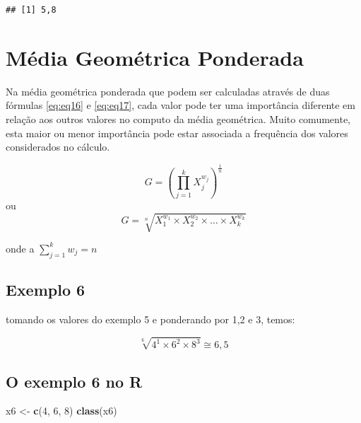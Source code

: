 \documentclass[
]{book}
\newenvironment{Shaded}{\begin{snugshade}}{\end{snugshade}}
\newcommand{\DecValTok}[1]{\textcolor[rgb]{0.00,0.00,0.81}{#1}}
\newcommand{\KeywordTok}[1]{\textcolor[rgb]{0.13,0.29,0.53}{\textbf{#1}}}
\newcommand{\NormalTok}[1]{#1}
\newcommand{\StringTok}[1]{\textcolor[rgb]{0.31,0.60,0.02}{#1}}
\begin{document}
\begin{verbatim}
## [1] 5,8
\end{verbatim}

\hypertarget{muxe9dia-geomuxe9trica-ponderada}{%
\section{Média Geométrica Ponderada}\label{muxe9dia-geomuxe9trica-ponderada}}

Na média geométrica ponderada que podem ser calculadas através de duas fórmulas \eqref{eq:eq16} e \eqref{eq:eq17}, cada valor pode ter uma importância diferente em relação aos outros valores no computo da média geométrica. Muito comumente, esta maior ou menor importância pode estar associada a frequência dos valores considerados no cálculo.

\begin{equation}
    G = \left(\prod_{j=1}^{k} X_j^{w_j} \right)^{\frac{1}{n}}
    \label{eq:eq16}
\end{equation}
ou
\begin{equation}
    G = \sqrt[n]{X_1^{w_1} \times X_2^{w_2} \times \ldots \times X_k^{w_k}}
    \label{eq:eq17}
\end{equation}

onde a \(\sum_{j=1}^{k} w_j = n\)

\hypertarget{exemplo-6}{%
\subsection{Exemplo 6}\label{exemplo-6}}

tomando os valores do exemplo 5 e ponderando por 1,2 e 3, temos:

\begin{equation*}
  \sqrt[6]{4^1 \times 6^2 \times 8^3} \cong 6,5
\end{equation*}

\hypertarget{o-exemplo-6-no-r}{%
\subsection{O exemplo 6 no R}\label{o-exemplo-6-no-r}}

\begin{Shaded}
\begin{Highlighting}[]
\NormalTok{x6 <-}\StringTok{ }\KeywordTok{c}\NormalTok{(}\DecValTok{4}\NormalTok{, }\DecValTok{6}\NormalTok{, }\DecValTok{8}\NormalTok{)}
\KeywordTok{class}\NormalTok{(x6)}
\end{Highlighting}
\end{Shaded}
\end{document}
